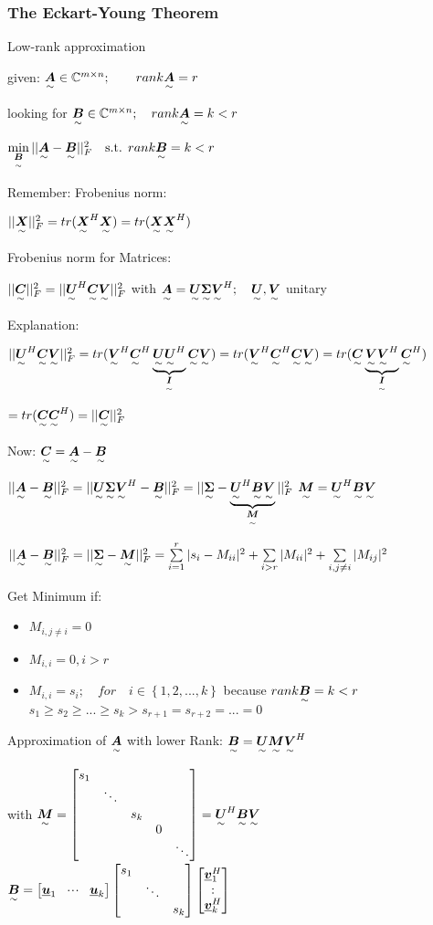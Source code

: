 \subsubsection{The Eckart-Young Theorem}
Low-rank approximation 

given: $\ma{A}\in \mathbb{C}^{m\times n};\qquad rank\ma{A}=r$

looking for $\ma{B}\in\mathbb{C}^{m\times n};\quad rank\ma{A}=k<r$

$\min\limits_{\ma{B}}||\ma{A}-\ma{B}||_F^2 \quad \textrm{s.t. } rank \ma{B}=k<r$

Remember: Frobenius norm: 

$||\ma{X}||_F^2=tr(\ma{X}^H\ma{X})=tr(\ma{X}\ma{X}^H)$ 

Frobenius norm for Matrices: 

$||\ma{C}||_F^2=||\ma{U}^H\ma{C}\ma{V}||_F^2$ \quad with \quad $\ma{A}=\ma{U}\ma{\Sigma}\ma{V}^H; \quad \ma{U},\ma{V}$ unitary

Explanation: 


$||\ma{U}^H\ma{C}\ma{V}||_F^2=tr(\ma{V}^H\ma{C}^H\underbrace{\ma{U}\ma{U}^H}_{\ma{I}}\ma{C}\ma{V})=tr(\ma{V}^H\ma{C}^H\ma{C}\ma{V})=tr(\ma{C}\underbrace{\ma{V}\ma{V}^H}_{\ma{I}}\ma{C}^H)$

$=tr(\ma{C}\ma{C}^H)=||\ma{C}||_F^2$


Now: $\ma{C}=\ma{A}-\ma{B}$

$||\ma{A}-\ma{B}||_F^2  =||\ma{U}\ma{\Sigma}\ma{V}^H-\ma{B}||_F^2  = ||\ma{\Sigma}-\underbrace{\ma{U}^H\ma{B}\ma{V}}_{\ma{M}}||_F^2$ \pfeil$\ma{M}=\ma{U}^H\ma{B}\ma{V}$

$||\ma{A}-\ma{B}||_F^2 =||\ma{\Sigma}-\ma{M}||_F^2
 = \sum\limits_{i=1}^r|s_i-M_{ii}|^2+\sum\limits_{i>r}|M_{ii}|^2+\sum\limits_{i,j\neq i}|M_{ij}|^2$
 
Get Minimum if:
\begin{itemize}
\item $M_{i,j\neq i}=0$
\item $M_{i,i}=0, i>r$
\item $M_{i,i}=s_i; \quad for\quad i\in\left\lbrace 1,2,...,k\right\rbrace$ \quad because \quad  $rank\ma{B}=k<r$
\\$s_1\geq s_2\geq ... \geq s_k > s_{r+1}=s_{r+2}=...=0$
\end{itemize}


Approximation of $\ma{A}$ with lower Rank: $\ma{B}=\ma{U}\ma{M}\ma{V}^H$

\quad with \quad $\ma{M}=
\mat{s_1 & & & &\\ & \ddots & & &\\ & & s_k & &\\ & & & 0 & \\ & & & & \ddots }
=\ma{U}^H\ma{B}\ma{V}$ \qquad
$\ma{B}=\mat{\vec{u}_1& \shdots & \vec{u}_k}\mat{s_1 & &\\ & \ddots &\\ & & s_k  }\mat{\vec{v}_1^H\\\svdots\\\vec{v}_k^H}$


